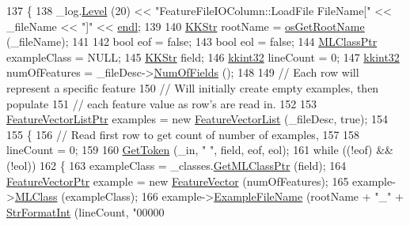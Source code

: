 \begin{DoxyCode}
137 \{
138   \_log.\hyperlink{class_k_k_b_1_1_run_log_a32cf761d7f2e747465fd80533fdbb659}{Level} (20) << \textcolor{stringliteral}{"FeatureFileIOColumn::LoadFile   FileName["} << \_fileName << \textcolor{stringliteral}{"]"} << 
      \hyperlink{namespace_k_k_b_ad1f50f65af6adc8fa9e6f62d007818a8}{endl};
139 
140   \hyperlink{class_k_k_b_1_1_k_k_str}{KKStr}  rootName = \hyperlink{namespace_k_k_b_af5b668ed9902d7f93b62529664a739f0}{osGetRootName} (\_fileName);
141 
142   \textcolor{keywordtype}{bool}        eof           = \textcolor{keyword}{false};
143   \textcolor{keywordtype}{bool}        eol           = \textcolor{keyword}{false};
144   \hyperlink{class_k_k_m_l_l_1_1_m_l_class}{MLClassPtr}  exampleClass  = NULL;
145   \hyperlink{class_k_k_b_1_1_k_k_str}{KKStr}       field;
146   \hyperlink{namespace_k_k_b_a8fa4952cc84fda1de4bec1fbdd8d5b1b}{kkint32}     lineCount     = 0;
147   \hyperlink{namespace_k_k_b_a8fa4952cc84fda1de4bec1fbdd8d5b1b}{kkint32}     numOfFeatures = \_fileDesc->\hyperlink{class_k_k_m_l_l_1_1_file_desc_a07abdfb77949dee565c555c7651581c2}{NumOfFields} ();
148 
149   \textcolor{comment}{// Each row will represent a specific feature}
150   \textcolor{comment}{// Will initially create empty examples, then populate}
151   \textcolor{comment}{// each feature value as row's are read in.}
152 
153   \hyperlink{class_k_k_m_l_l_1_1_feature_vector_list}{FeatureVectorListPtr}  examples = \textcolor{keyword}{new} \hyperlink{class_k_k_m_l_l_1_1_feature_vector_list}{FeatureVectorList} (\_fileDesc, \textcolor{keyword}{
      true});
154 
155   \{
156     \textcolor{comment}{// Read first row to get count of number of examples,}
157 
158     lineCount = 0;
159 
160     \hyperlink{class_k_k_m_l_l_1_1_feature_file_i_o_ae79ac82b32e63fa7e7d96c833b5631f2}{GetToken} (\_in, \textcolor{stringliteral}{" "}, field, eof, eol);
161     \textcolor{keywordflow}{while}  ((!eof)  &&  (!eol))
162     \{
163       exampleClass = \_classes.\hyperlink{class_k_k_m_l_l_1_1_m_l_class_list_ab751a744d6e0d8937ca64b9cdde1488b}{GetMLClassPtr} (field);
164       \hyperlink{class_k_k_m_l_l_1_1_feature_vector}{FeatureVectorPtr}  example = \textcolor{keyword}{new} \hyperlink{class_k_k_m_l_l_1_1_feature_vector}{FeatureVector} (numOfFeatures);
165       example->\hyperlink{class_k_k_m_l_l_1_1_feature_vector_a3c8fe002c6e868f8c00059c004fb32fd}{MLClass} (exampleClass);
166       example->\hyperlink{class_k_k_m_l_l_1_1_feature_vector_ab47c89ab1e9396664fdc0dc34b6e1ab5}{ExampleFileName} (rootName + \textcolor{stringliteral}{"\_"} + \hyperlink{namespace_k_k_b_ae3bde258fa036604fac8bdb0277ab46e}{StrFormatInt} (lineCount, \textcolor{stringliteral}{"00000
}
\end{DoxyCode}
